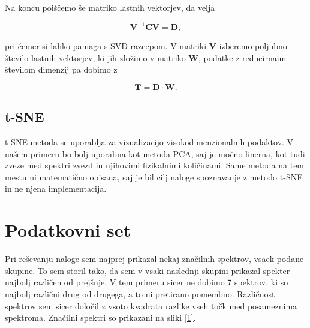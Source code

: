 \documentclass[11pt,a4paper]{article}
\begin{document}
Na koncu poiščemo še matriko lastnih vektorjev, da velja

\begin{equation}
	\mathbf{V}^{-1}\mathbf{C}\mathbf{V} = \mathbf{D},
\end{equation}

pri čemer si lahko pamaga s SVD razcepom. V matriki $\mathbf{V}$ izberemo poljubno število lastnih vektorjev, ki jih zložimo v matriko $\mathbf{W}$, podatke z reducirnaim številom dimenzij pa dobimo z

\begin{equation}
	\mathbf{T} = \mathbf{D} \cdot \mathbf{W}.
\end{equation}

\subsection{t-SNE}

t-SNE metoda se uporablja za vizualizacijo visokodimenzionalnih podaktov. V našem primeru bo bolj uporabna kot metoda PCA, saj je močno linerna, kot tudi zveze med spektri zvezd in njihovimi fizikalnimi količinami. Same metoda na tem mestu ni matematično opisana, saj je bil cilj naloge spoznavanje z metodo t-SNE in ne njena implementacija.

\section{Podatkovni set}

Pri reševanju naloge sem najprej prikazal nekaj značilnih spektrov, vsaek podane skupine. To sem storil tako, da sem v vsaki naslednji skupini prikazal spekter najbolj različen od prejšnje. V tem primeru sicer ne dobimo 7 spektrov, ki so najbolj različni drug od drugega, a to ni pretirano pomembno. Različnost spektrov sem sicer določil z vsoto kvadrata razlike vseh točk med posameznima spektroma. Značilni spektri so prikazani na sliki \ref{1}.
\end{document}
